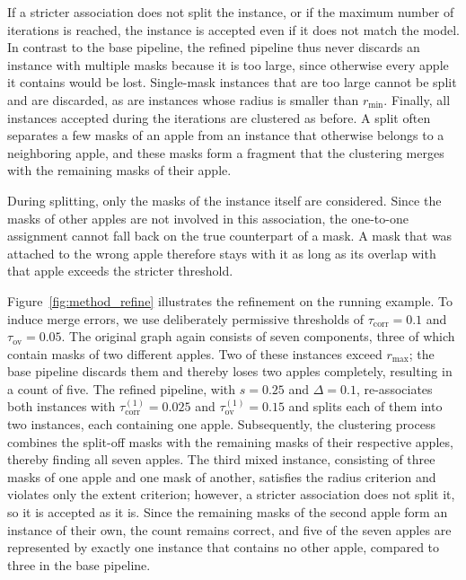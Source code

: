 \documentclass[english, egger, bsc]{vcethesis}
\begin{document}
If a stricter association does not split the instance, or if the maximum number of iterations is reached, the instance is accepted even if it does not match the model. In contrast to the base pipeline, the refined pipeline thus never discards an instance with multiple masks because it is too large, since otherwise every apple it contains would be lost. Single-mask instances that are too large cannot be split and are discarded, as are instances whose radius is smaller than $r_{\min}$. Finally, all instances accepted during the iterations are clustered as before. A split often separates a few masks of an apple from an instance that otherwise belongs to a neighboring apple, and these masks form a fragment that the clustering merges with the remaining masks of their apple.

During splitting, only the masks of the instance itself are considered. Since the masks of other apples are not involved in this association, the one-to-one assignment cannot fall back on the true counterpart of a mask. A mask that was attached to the wrong apple therefore stays with it as long as its overlap with that apple exceeds the stricter threshold.

Figure~\ref{fig:method_refine} illustrates the refinement on the running example. To induce merge errors, we use deliberately permissive thresholds of $\tau_{\mathrm{corr}} = 0.1$ and $\tau_{\mathrm{ov}} = 0.05$. The original graph again consists of seven components, three of which contain masks of two different apples. Two of these instances exceed $r_{\max}$; the base pipeline discards them and thereby loses two apples completely, resulting in a count of five. The refined pipeline, with $s = 0.25$ and $\Delta = 0.1$, re-associates both instances with $\tau_{\mathrm{corr}}^{(1)} = 0.025$ and $\tau_{\mathrm{ov}}^{(1)} = 0.15$ and splits each of them into two instances, each containing one apple. Subsequently, the clustering process combines the split-off masks with the remaining masks of their respective apples, thereby finding all seven apples. The third mixed instance, consisting of three masks of one apple and one mask of another, satisfies the radius criterion and violates only the extent criterion; however, a stricter association does not split it, so it is accepted as it is. Since the remaining masks of the second apple form an instance of their own, the count remains correct, and five of the seven apples are represented by exactly one instance that contains no other apple, compared to three in the base pipeline.
\end{document}
